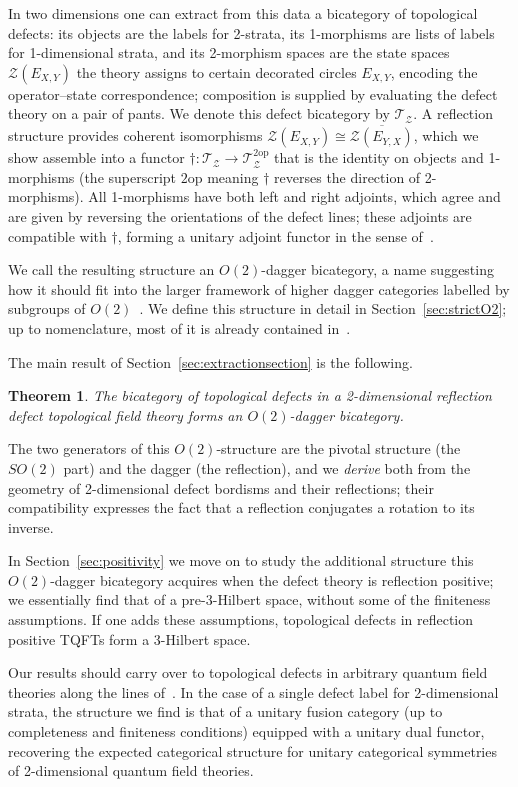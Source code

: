 \documentclass[11pt]{article}
\newtheorem{theorem}{Theorem}[section]
\theoremstyle{definition}
\newcommand{\cT}{\mathcal{T}}
\newcommand{\cZ}{\mathcal{Z}}
\newcommand{\op}{\mathrm{op}}
\newcommand{\SO}{SO}
\newcommand{\Or}{O} %
\newcommand{\dg}{\dagger}
\begin{document}
In two dimensions one can extract from this data a bicategory of topological defects: its objects are the labels for 2-strata, its 1-morphisms are lists of labels for 1-dimensional strata, and its 2-morphism spaces are the state spaces $\cZ(E_{X,Y})$ the theory assigns to certain decorated circles $E_{X,Y}$, encoding the operator--state correspondence; composition is supplied by evaluating the defect theory on a pair of pants. We denote this defect bicategory by $\cT_\cZ$. A reflection structure provides coherent isomorphisms $\cZ(E_{X,Y}) \cong \overline{\cZ(E_{Y,X})}$, which we show assemble into a functor $\dg \colon \cT_\cZ \to \cT_\cZ^{2\op}$ that is the identity on objects and 1-morphisms (the superscript $2\op$ meaning $\dg$ reverses the direction of 2-morphisms). All 1-morphisms have both left and right adjoints, which agree and are given by reversing the orientations of the defect lines; these adjoints are compatible with $\dg$, forming a unitary adjoint functor in the sense of~\cite{Pen20,CHFHS24}.

We call the resulting structure an $\Or(2)$-dagger bicategory, a name suggesting how it should fit into the larger framework of higher dagger categories labelled by subgroups of $\Or(2)$~\cite{FHJF24,Mue25}. We define this structure in detail in Section~\ref{sec:strictO2}; up to nomenclature, most of it is already contained in~\cite{CHFHS24}.  

The main result of Section~\ref{sec:extractionsection} is the following. 
\begin{theorem}
The bicategory of topological defects in a 2-dimensional reflection defect topological field theory forms an $\Or(2)$-dagger bicategory. 
\end{theorem}   
 
 The two generators of this $\Or(2)$-structure are the pivotal structure (the $\SO(2)$ part) and the dagger (the reflection), and we \emph{derive} both from the geometry of 2-dimensional defect bordisms and their reflections; their compatibility expresses the fact that a reflection conjugates a rotation to its inverse.

In Section~\ref{sec:positivity} we move on to study the additional structure this $\Or(2)$-dagger bicategory acquires when the defect theory is reflection positive; we essentially find that of a pre-3-Hilbert space, without some of the finiteness assumptions. If one adds these assumptions, topological defects in reflection positive TQFTs form a 3-Hilbert space.
 
 Our results should carry over to topological defects in arbitrary quantum field theories along the lines of~\cite{DKR11}. In the case of a single defect label for 2-dimensional strata, the structure we find is that of a unitary fusion category (up to completeness and finiteness conditions) equipped with a unitary dual functor, recovering the expected categorical structure for unitary categorical symmetries of 2-dimensional quantum field theories.
\end{document}
